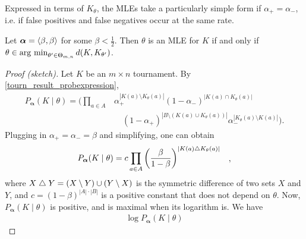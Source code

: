 Expressed in terms of $K_\theta$, the MLEs take a
particularly simple form if $\alpha_+ = \alpha_-$, i.e. if false positives and
false negatives occur at the same rate.

\begin{lemma}
   \label{tourn_result_mle_hamming}

   Let $\bm{\alpha} = \langle{\beta, \beta}\rangle$ for some $\beta < \frac{1}{2}$.
   Then $\theta$ is an MLE for $K$ if and only if $\theta \in \operatorname*{arg\ min}_{\theta'
   \in \Theta_{m,n}}{d(K, K_{\theta'})}$.
\end{lemma}

\begin{proof}[Proof (sketch)]

    Let $K$ be an $m \times n$ tournament. By
    \cref{tourn_result_probexpression},
    \begin{equation*}
       \begin{split}
           P_{\bm{\alpha}}(K \mid \theta)
           =
           \Big(
           \prod_{a \in A}
             &\alpha_+^{|K(a) \setminus K_\theta(a)|}
             (1 - \alpha_-)^{|K(a) \cap K_\theta(a)|}
             \\
             &\quad (1 - \alpha_+)^{|B \setminus (K(a) \cup K_\theta(a))|}
             \alpha_-^{|K_\theta(a) \setminus K(a)|}
           \Big).
       \end{split}
    \end{equation*}
    Plugging in $\alpha_+ = \alpha_- = \beta$ and simplifying, one can obtain
    \[
       \begin{aligned}
       P_{\bm{\alpha}}(K \mid \theta)
           &=  c
               \prod_{a \in A}{
                \left(
                  \frac{\beta}{1 - \beta}
                \right)^{
                  |K(a) \mathrel{\triangle} K_\theta(a)|
                }
           }
       \end{aligned},
    \]
    where $X \mathrel{\triangle} Y = (X \setminus Y) \cup (Y \setminus X)$ is the
    symmetric difference of two sets $X$ and $Y$, and $c = (1
    - \beta)^{|A| \cdot |B|}$ is a positive constant that does not depend on
    $\theta$. Now, $P_{\bm{\alpha}}(K \mid \theta)$ is positive, and is maximal
    when its logarithm is. We have
    \[
       \begin{aligned}
           \log{P_{\bm{\alpha}}(K \mid \theta)}

\end{aligned}\]
\end{proof}
